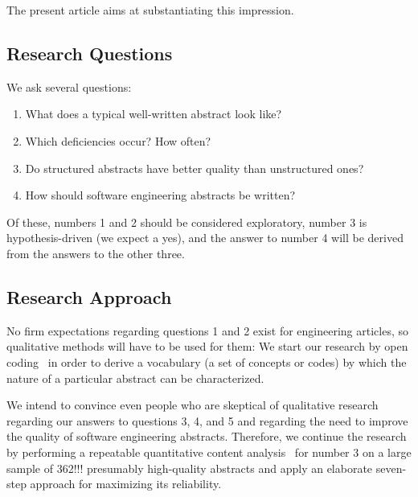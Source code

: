\documentclass[10pt,journal,compsoc]{IEEEtran}
\begin{document}
The present article aims at substantiating this impression.




\subsection{Research Questions}

\noindent
We ask several questions:
\begin{enumerate}
	\item What does a typical well-written abstract look like?
	\item Which deficiencies occur? How often?
	\item Do structured abstracts have better quality than unstructured ones?
	\item How should software engineering abstracts be written?
\end{enumerate}
Of these, numbers 1 and 2 should be considered exploratory,
number 3 is hypothesis-driven (we expect a yes), and
the answer to number 4 will be derived from the answers to the other three.


\subsection{Research Approach}

No firm expectations regarding questions 1 and 2 exist for engineering articles,
so qualitative methods will have to be used for them:
We start our research by open coding~\cite[Ch. 5]{StrCor90} in order to derive a vocabulary (a set of concepts or codes)
by which the nature of a particular abstract can be characterized.

We intend to convince even people who are skeptical of qualitative research
regarding our answers to questions 3, 4, and 5 and regarding the need to improve
the quality of software engineering abstracts.
Therefore, we continue the research by performing a repeatable
quantitative content analysis~\cite[Ch. 7]{Krippendorff04} for number 3
on a large sample of 362!!! presumably high-quality abstracts
and apply an elaborate seven-step approach for maximizing its reliability.
\end{document}
